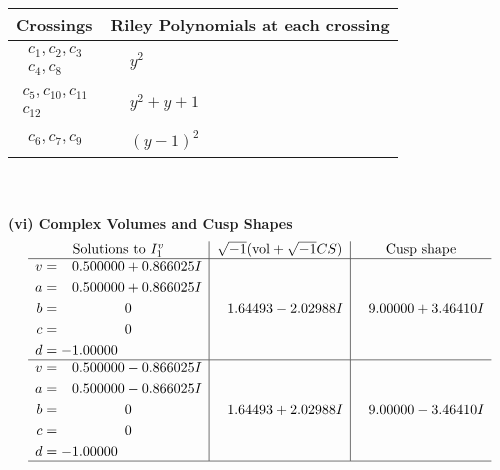 \documentclass[1p]{elsarticle_modified}
\theoremstyle{definition}
\newcommand{\I}{\sqrt{-1}}
\begin{document}
\begin{tabular}{m{50pt}|m{274pt}}
Crossings & \hspace{64pt}Riley Polynomials at each crossing \\
\hline $$\begin{aligned}c_{1},c_{2},c_{3}\\c_{4},c_{8}\end{aligned}$$&$\begin{aligned}
&y^2
\end{aligned}$\\
\hline $$\begin{aligned}c_{5},c_{10},c_{11}\\c_{12}\end{aligned}$$&$\begin{aligned}
&y^2+y+1
\end{aligned}$\\
\hline $$\begin{aligned}c_{6},c_{7},c_{9}\end{aligned}$$&$\begin{aligned}
&(y-1)^2
\end{aligned}$\\
\hline
\end{tabular}\\~\\
\newpage\flushleft \textbf{(vi) Complex Volumes and Cusp Shapes}
$$\begin{array}{c|c|c}  
\text{Solutions to }I^v_{1}& \I (\text{vol} + \sqrt{-1}CS) & \text{Cusp shape}\\
 \hline 
\begin{aligned}
v &= \phantom{-}0.500000 + 0.866025 I \\
a &= \phantom{-}0.500000 + 0.866025 I \\
b &= \phantom{-0.000000 } 0 \\
c &= \phantom{-0.000000 } 0 \\
d &= -1.00000\phantom{ +0.000000I}\end{aligned}
 & \phantom{-}1.64493 - 2.02988 I & \phantom{-}9.00000 + 3.46410 I \\ \hline\begin{aligned}
v &= \phantom{-}0.500000 - 0.866025 I \\
a &= \phantom{-}0.500000 - 0.866025 I \\
b &= \phantom{-0.000000 } 0 \\
c &= \phantom{-0.000000 } 0 \\
d &= -1.00000\phantom{ +0.000000I}\end{aligned}
 & \phantom{-}1.64493 + 2.02988 I & \phantom{-}9.00000 - 3.46410 I\\
 \hline 
 \end{array}$$\newpage\newpage\renewcommand{\arraystretch}{1}
\end{document}
